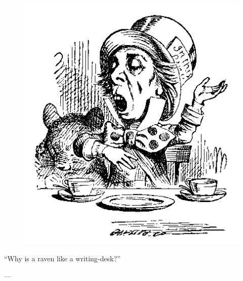 \cleartoevenpage[\thispagestyle{empty}]

\thispagestyle{empty}

\vspace*{\fill}

\begin{figure}[h]
  \begin{center}
    \includegraphics[scale=0.8]{hatter}
  \end{center}
  \label{fig:hatter}
\end{figure}

\epigraph{
  ``Why is a raven like a writing-desk?''
}{---\textcite[79]{carroll-2004}}

\vspace*{\fill}
